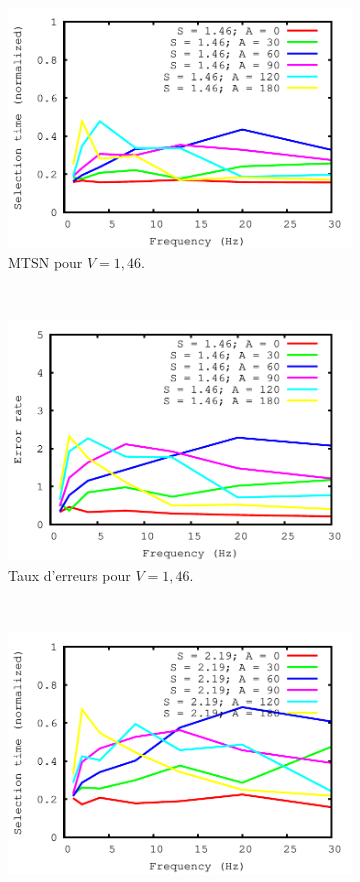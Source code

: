 \begin{figure}[!htb]
\begin{subfigure}[t]{\subImgWlineplot}
			\includegraphics[width=\textwidth]{figures/ch4/frequency_speed_1_46_times}
			\caption{MTSN pour $V = 1,46$.}
			\label{fig:fEffect_t_146}
		\end{subfigure}
		~
		\begin{subfigure}[t]{\subImgWlineplot}
			\centering
			\includegraphics[width=\textwidth]{figures/ch4/frequency_speed_1_46_errors}
			\caption{Taux d'erreurs pour $V = 1,46$.}
			\label{fig:fEffect_e_146}
		\end{subfigure}
		~
		\begin{subfigure}[t]{\subImgWlineplot}
			\centering
			\includegraphics[width=\textwidth]{figures/ch4/frequency_speed_2_19_times}

\end{subfigure}
\end{figure}
